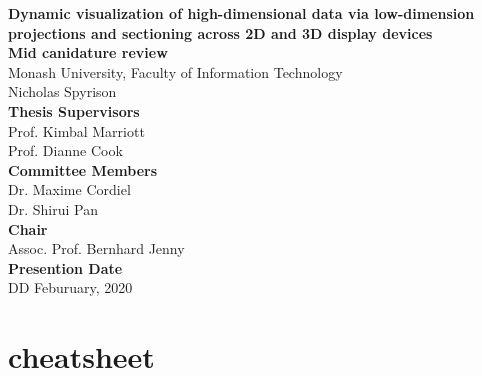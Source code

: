 \documentclass[11,]{article}
\title{}
\author{}
\date{}
\begin{document}

\onehalfspacing
{}

\begin{center}
\LARGE{\textbf{Dynamic visualization of high-dimensional data via
low-dimension projections and sectioning across 2D and 3D display devices}}\\
\vspace*{2\baselineskip}
\Large{\textbf{Mid canidature review}}\\
\normalsize{Monash University, Faculty of Information Technology}\\
\vspace*{2\baselineskip}
\Large{Nicholas Spyrison}\\ %
\vspace*{3\baselineskip}
\Large{\textbf{Thesis Supervisors}}\\
Prof. Kimbal Marriott\\
Prof. Dianne Cook\\
\vspace*{2\baselineskip}
\Large{\textbf{Committee Members}}\\
Dr. Maxime Cordiel\\
Dr. Shirui Pan\\
\vspace*{1\baselineskip}
\Large{\textbf{Chair}}\\
Assoc. Prof. Bernhard Jenny\\
\vspace*{1\baselineskip}
\Large{\textbf{Presention Date}}\\
DD Feburuary, 2020
\end{center}

\doublespacing

\hypersetup{linkcolor = blue}
\newpage
{}
\tableofcontents
{}

\newpage

% 

\doublespacing

\newpage
{}
\hypersetup{linkcolor = blue}

{
\hypersetup{linkcolor=black}
\setcounter{tocdepth}{2}
\tableofcontents
}
\hypertarget{cheatsheet}{%
\section{cheatsheet}\label{cheatsheet}}
\end{document}
